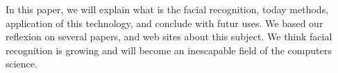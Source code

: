 In this paper, we will explain what is the facial recognition, today methods, application of this technology, and conclude with futur uses. We based our reflexion on several papers, and web sites about this subject. We think facial recognition is growing and will become an inescapable field of the computers science.
